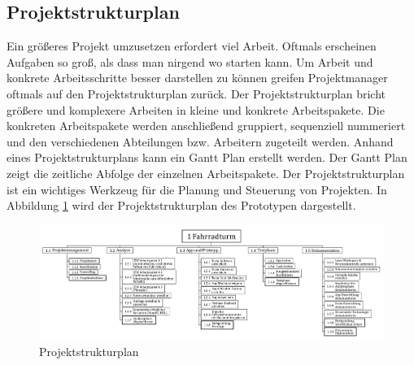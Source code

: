 \subsection{Projektstrukturplan}

Ein größeres Projekt umzusetzen erfordert viel Arbeit. Oftmals erscheinen Aufgaben so groß, als dass man nirgend wo starten kann. Um Arbeit und konkrete Arbeitsschritte besser darstellen zu können greifen Projektmanager oftmals auf den Projektstrukturplan zurück. Der Projektstrukturplan bricht größere und komplexere Arbeiten in kleine und konkrete Arbeitspakete. Die konkreten Arbeitspakete werden anschließend gruppiert, sequenziell nummeriert und den verschiedenen Abteilungen bzw. Arbeitern zugeteilt werden. Anhand eines Projektstrukturplans kann ein Gantt Plan erstellt werden. Der Gantt Plan zeigt die zeitliche Abfolge der einzelnen Arbeitspakete. Der Projektstrukturplan ist ein wichtiges Werkzeug für die Planung und Steuerung von Projekten. In Abbildung \ref{fig:projektstrukturplan} wird der Projektstrukturplan des Prototypen dargestellt.

\begin{figure}[H]
  \centering
  \includegraphics[width=1\textwidth]{images/projektstrukturplan}
  \caption{Projektstrukturplan}
  \label{fig:projektstrukturplan}
\end{figure}
